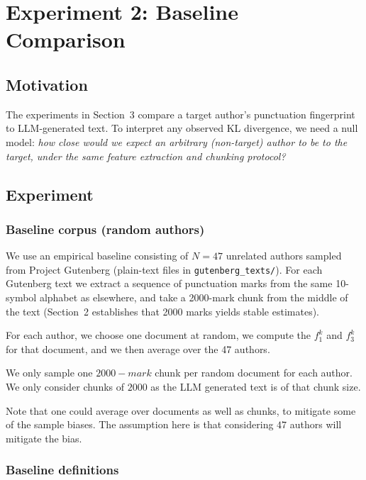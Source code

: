 \documentclass{article}
\begin{document}
\section{Experiment 2: Baseline Comparison}\label{llm_baseline}

\subsection{Motivation}
\label{subsec:baseline_motivation}

The experiments in Section~3 compare a target author's punctuation fingerprint to LLM-generated text. To interpret any observed KL divergence, we need a null model: \emph{how close would we expect an arbitrary (non-target) author to be to the target, under the same feature extraction and chunking protocol?}

\subsection{Experiment}
\subsubsection{Baseline corpus (random authors)}
\label{subsec:baseline_corpus}

We use an empirical baseline consisting of $N=47$ unrelated authors sampled from Project Gutenberg (plain-text files in \texttt{gutenberg\_texts/}). For each Gutenberg text we extract a sequence of punctuation marks from the same 10-symbol alphabet as elsewhere, and take a 2000-mark chunk from the middle of the text (Section~2 establishes that 2000 marks yields stable estimates).

For each author, we choose one document at random, we compute the $f_1^k$ and $f_3^k$ for that document, and we then average over the 47 authors. 

We only sample one $2000-mark$ chunk per random document for each author. We only consider chunks of $2000$ as the LLM generated text is of that chunk size. 

Note that one could average over documents as well as chunks, to mitigate some of the sample biases. The assumption here is that considering $47$ authors will mitigate the bias.

\subsubsection{Baseline definitions}
\label{subsec:baseline_definitions}
\end{document}

